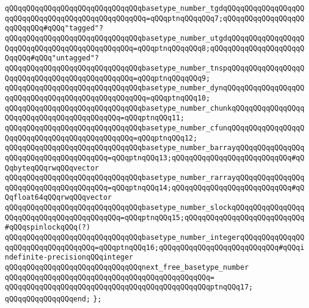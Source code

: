 \verb|qQQqqQQqqQQqqQQqqQQqqQQqqQQqqQQqbasetype_number_tgdqQQqqQQqqQQqqQQqqQQqqQQqqQQqqQQqqQQqqQQqqQQqqQQqqQQq=qQQqptnqQQqqQQq7;qQQqqQQqqQQqqQQqqQQqqQQqqQQq#qQQq"tagged"?|\newline
\verb|qQQqqQQqqQQqqQQqqQQqqQQqqQQqqQQqbasetype_number_utgdqQQqqQQqqQQqqQQqqQQqqQQqqQQqqQQqqQQqqQQqqQQqqQQq=qQQqptnqQQqqQQq8;qQQqqQQqqQQqqQQqqQQqqQQqqQQq#qQQq"untagged"?|\newline
\verb|qQQqqQQqqQQqqQQqqQQqqQQqqQQqqQQqbasetype_number_tnspqQQqqQQqqQQqqQQqqQQqqQQqqQQqqQQqqQQqqQQqqQQqqQQq=qQQqptnqQQqqQQq9;|\newline
\verb|qQQqqQQqqQQqqQQqqQQqqQQqqQQqqQQqbasetype_number_dynqQQqqQQqqQQqqQQqqQQqqQQqqQQqqQQqqQQqqQQqqQQqqQQqqQQq=qQQqptnqQQq10;|\newline
\verb|qQQqqQQqqQQqqQQqqQQqqQQqqQQqqQQqbasetype_number_chunkqQQqqQQqqQQqqQQqqQQqqQQqqQQqqQQqqQQqqQQqqQQq=qQQqptnqQQq11;|\newline
\verb|qQQqqQQqqQQqqQQqqQQqqQQqqQQqqQQqbasetype_number_cfunqQQqqQQqqQQqqQQqqQQqqQQqqQQqqQQqqQQqqQQqqQQqqQQq=qQQqptnqQQq12;|\newline
\verb|qQQqqQQqqQQqqQQqqQQqqQQqqQQqqQQqbasetype_number_barrayqQQqqQQqqQQqqQQqqQQqqQQqqQQqqQQqqQQqqQQq=qQQqptnqQQq13;qQQqqQQqqQQqqQQqqQQqqQQqqQQq#qQQqbyteqQQqrwqQQqvector|\newline
\verb|qQQqqQQqqQQqqQQqqQQqqQQqqQQqqQQqbasetype_number_rarrayqQQqqQQqqQQqqQQqqQQqqQQqqQQqqQQqqQQqqQQq=qQQqptnqQQq14;qQQqqQQqqQQqqQQqqQQqqQQqqQQq#qQQqfloat64qQQqrwqQQqvector|\newline
\verb|qQQqqQQqqQQqqQQqqQQqqQQqqQQqqQQqbasetype_number_slockqQQqqQQqqQQqqQQqqQQqqQQqqQQqqQQqqQQqqQQqqQQq=qQQqptnqQQq15;qQQqqQQqqQQqqQQqqQQqqQQqqQQq#qQQqspinlockqQQq(?)|\newline
\verb|qQQqqQQqqQQqqQQqqQQqqQQqqQQqqQQqbasetype_number_integerqQQqqQQqqQQqqQQqqQQqqQQqqQQqqQQqqQQq=qQQqptnqQQq16;qQQqqQQqqQQqqQQqqQQqqQQqqQQq#qQQqindefinite-precisionqQQqinteger|\newline
\newline
\verb|qQQqqQQqqQQqqQQqqQQqqQQqqQQqqQQqnext_free_basetype_number|\newline
\verb|qQQqqQQqqQQqqQQqqQQqqQQqqQQqqQQqqQQqqQQqqQQqqQQq=|\newline
\verb|qQQqqQQqqQQqqQQqqQQqqQQqqQQqqQQqqQQqqQQqqQQqqQQqptnqQQq17;|\newline
\newline
\verb|qQQqqQQqqQQqqQQqend;|\newline
\verb|};|\newline

